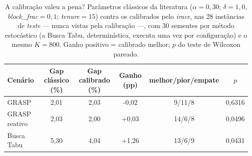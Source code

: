 \begin{table}[H]
\centering
\caption{A calibração valeu a pena? Parâmetros clássicos da literatura ($\alpha{=}0{,}30$; $\delta{=}1{,}0$, \textit{block\_frac}$=0{,}1$; \textit{tenure}$=15$) contra os calibrados pelo \textit{irace}, nas 28 instâncias de \emph{teste} --- nunca vistas pela calibração ---, com 30 sementes por método estocástico (a Busca Tabu, determinística, executa uma vez por configuração) e o mesmo $K=800$. Ganho positivo = calibrado melhor; $p$ do teste de Wilcoxon pareado.}\label{tab:gain}
\footnotesize\setlength{\tabcolsep}{4pt}
\begin{tabular}{lccccc}
\toprule
\textbf{Cenário} & \textbf{Gap clássico (\%)} & \textbf{Gap calibrado (\%)} & \textbf{Ganho (pp)} & \textbf{melhor/pior/empate} & $p$ \\
\midrule
GRASP & 2{,}01 & 2{,}03 & -0{,}02 & 9/11/8 & 0{,}6316 \\
GRASP reativo & 2{,}03 & 2{,}00 & +0{,}03 & 14/6/8 & 0{,}0496 \\
Busca Tabu & 5{,}30 & 4{,}04 & +1{,}26 & 13/6/9 & 0{,}0431 \\
\bottomrule
\end{tabular}
\end{table}
